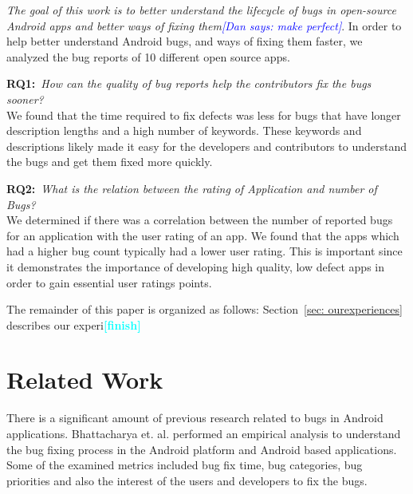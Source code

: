 \documentclass{sig-alternate}
\newcommand{\todo}[1]{\textcolor{cyan}{\textbf{[#1]}}}
\newcommand{\dan}[1]{\textcolor{blue}{{\it [Dan says: #1]}}}
\begin{document}

\emph{The goal of this work is to better understand the lifecycle of bugs in open-source Android apps and better ways of fixing them}\dan{make perfect}. In order to help better understand Android bugs, and ways of fixing them faster, we analyzed the bug reports of 10 different open source apps. %
 
\textbf{RQ1:}~\emph{How can the quality of bug reports help the contributors fix the bugs sooner?}\\
We found that the time required to fix defects was less for bugs that have longer description lengths and a high number of keywords. These keywords and descriptions likely made it easy for the developers and contributors to understand the bugs and get them fixed more quickly. 

\textbf{RQ2:}~\emph{What is the relation between the rating of Application and number of Bugs?}\\
We determined if there was a correlation between the number of reported bugs for an application with the user rating of an app. We found that the apps which had a higher bug count typically had a lower user rating. This is important since it demonstrates the importance of developing high quality, low defect apps in order to gain essential user ratings points.


The remainder of this paper is organized as follows: Section~\ref{sec: ourexperiences} describes our experi\todo{finish}
 


\section{Related Work}
\label{sec:relatedwork}





There is a significant amount of previous research related to bugs in Android applications. Bhattacharya et. al.\cite{Bhattacharya:2013:EAB:2495256.2495768} performed an empirical analysis to understand the bug fixing process in the Android platform and Android based applications. Some of the examined metrics included bug fix time, bug categories, bug priorities and also the interest of the users and developers to fix the bugs.
\end{document}
